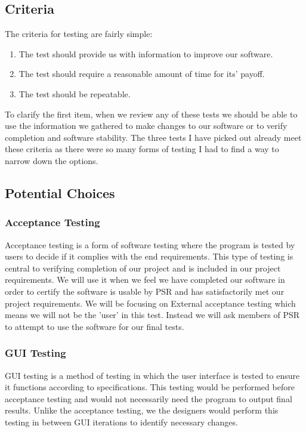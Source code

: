 \documentclass[onecolumn, draftclsnofoot,10pt, compsoc]{IEEEtran}
\begin{document}
\subsection{Criteria}
The criteria for testing are fairly simple:
\begin{enumerate}
    \item The test should provide us with information to improve our software.
    \item The test should require a reasonable amount of time for its' payoff.
    \item The test should be repeatable.
\end{enumerate}
To clarify the first item, when we review any of these tests we should be able to use the information we gathered to make changes to our software or to verify completion and software stability. The three tests I have picked out already meet these criteria as there were so many forms of testing I had to find a way to narrow down the options.

\subsection{Potential Choices}

\subsubsection{Acceptance Testing}
Acceptance testing is a form of software testing where the program is tested by users to decide if it complies with the end requirements. 
This type of testing is central to verifying completion of our project and is included in our project requirements.
We will use it when we feel we have completed our software in order to certify the software is usable by PSR and has satisfactorily met our project requirements.
We will be focusing on External acceptance testing which means we will not be the 'user' in this test. 
Instead we will ask members of PSR to attempt to use the software for our final tests.

\subsubsection{GUI Testing}
GUI testing is a method of testing in which the user interface is tested to ensure it functions according to specifications. 
This testing would be performed before acceptance testing and would not necessarily need the program to output final results. 
Unlike the acceptance testing, we the designers would perform this testing in between GUI iterations to identify necessary changes. 
\end{document}
